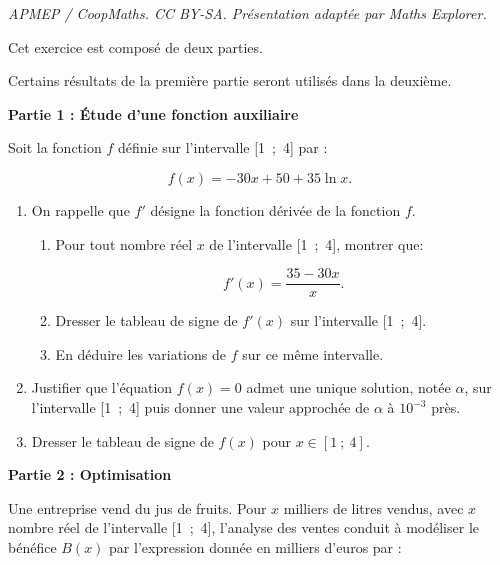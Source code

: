 \documentclass[10pt]{article}
\begin{document}
\noindent\textit{APMEP / CoopMaths. CC BY-SA. Présentation adaptée par Maths Explorer.}\par\medskip
\medskip


\medskip

Cet exercice est composé de deux parties.

\medskip

Certains résultats de la première partie seront utilisés dans la deuxième.

\medskip

\begin{center}\textbf{Partie 1 : Étude d'une fonction auxiliaire}\end{center}

Soit la fonction $f$ définie sur l'intervalle [1~;~4] par : 

\[f(x) = - 30x + 50 + 35\ln x.\]

\begin{enumerate}
\item On rappelle que $f'$ désigne la fonction dérivée de la fonction $f$.
	\begin{enumerate}
		\item Pour tout nombre réel $x$ de l'intervalle [1~;~4], montrer que: 
		
\[f'(x) = \dfrac{35- 30x}{x}.\]

		\item Dresser le tableau de signe de $f'(x)$ sur l'intervalle [1~;~4].
		\item En déduire les variations de $f$ sur ce même intervalle.
	\end{enumerate}
\item Justifier que l'équation $f(x) = 0$ admet une unique solution, notée $\alpha$, sur l'intervalle [1~;~4] puis donner une valeur approchée de $\alpha$ à $10^{-3}$ près.
\item  Dresser le tableau de signe de $f(x)$ pour $x \in [1~;~4]$.
\end{enumerate}

\bigskip

\textbf{Partie 2 : Optimisation}

\medskip

Une entreprise vend du jus de fruits. Pour $x$ milliers de litres vendus, avec $x$ nombre réel de l'intervalle [1~;~4], l'analyse des ventes conduit à modéliser le bénéfice $B(x)$ par l'expression donnée en milliers d'euros par :
\end{document}
